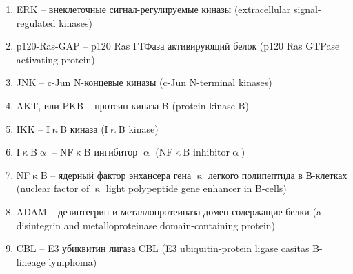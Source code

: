 \begin{enumerate}
	\item ERK --  внеклеточные сигнал-регулируемые киназы (extracellular signal-regulated kinases)
	\item p120-Ras-GAP -- p120 Ras ГТФаза активирующий белок (p120 Ras GTPase activating protein)
	\item JNK -- c-Jun N-концевые киназы (c-Jun N-terminal kinases)
	\item AKT, или PKB -- протеин киназа B (protein-kinase B)
	\item IKK -- I$\upkappa$B киназа (I$\upkappa$B kinase)
	\item I$\upkappa$B$\upalpha$ -- NF$\upkappa$B ингибитор $\upalpha$ (NF$\upkappa$B inhibitor$\upalpha$)
	\item NF$\upkappa$B -- ядерный фактор энхансера гена $\upkappa$ легкого полипептида в В-клетках (nuclear factor of $\upkappa$ light polypeptide gene enhancer in B-cells)
	\item ADAM -- дезинтегрин и металлопротеиназа домен-содержащие белки (a disintegrin and metalloproteinase domain-containing protein)
	\item CBL -- E3 убиквитин лигаза CBL (E3 ubiquitin-protein ligase casitas B-lineage lymphoma)
\end{enumerate}